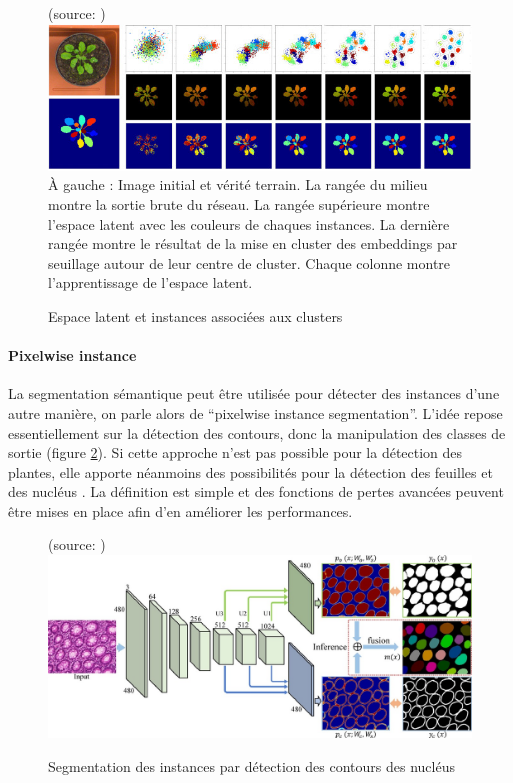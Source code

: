 \documentclass[../thesis.tex]{subfiles}
\begin{document}
    \begin{figure}[H]
        \centering
        {\scriptsize (source: \cite{DBLP:journals/corr/abs-1708-02551})} \\
        \includegraphics[width=\linewidth]{img/biblio/segmentation-embeding} \\
        \scriptsize À gauche : Image initial et vérité terrain. La rangée du milieu montre la sortie brute du réseau. La rangée supérieure montre l'espace latent avec les couleurs de chaques instances. La dernière rangée montre le résultat de la mise en cluster des embeddings par seuillage autour de leur centre de cluster. Chaque colonne montre l'apprentissage de l'espace latent.
        \caption{Espace latent et instances associées aux clusters}
        \label{fig:03-segmentation-embeding}
    \end{figure}
    
    \paragraph{Pixelwise instance} La segmentation sémantique peut être utilisée pour détecter des instances d'une autre manière, on parle alors de ``pixelwise instance segmentation''. L'idée repose essentiellement sur la détection des contours, donc la manipulation des classes de sortie (figure \ref{fig:03-segmentation-dcan}). Si cette approche n'est pas possible pour la détection des plantes, elle apporte néanmoins des possibilités pour la détection des feuilles \cite{morris2018pyramid} et des nucléus \cite{DBLP:journals/corr/abs-1810-06933}. La définition est simple et des fonctions de pertes avancées peuvent être mises en place afin d'en améliorer les performances.
    
    \begin{figure}[H]
        \centering
        {\scriptsize (source: \cite{DBLP:journals/corr/abs-1810-06933})} \\
        \includegraphics[width=0.7\linewidth]{img/biblio/segmentation-dcan}
        \caption{Segmentation des instances par détection des contours des nucléus}
        \label{fig:03-segmentation-dcan}
    \end{figure}
    
\end{document}
